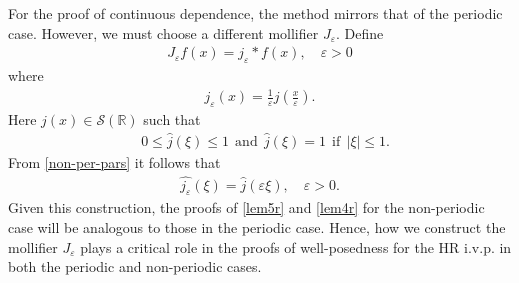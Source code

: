 \documentclass[12pt,reqno]{amsart}
\newcommand{\rr}{\mathbb{R}}
\newcommand{\ee}{\varepsilon}
\theoremstyle{plain}  %
\theoremstyle{definition}
\begin{document}
For the proof of continuous dependence, the method mirrors that 
of the periodic case. However, we must choose a different mollifier 
$J_\ee$. Define
\begin{equation}
\begin{split}
J_\ee f(x) = j_\ee * f(x), \quad \ee>0
\end{split}
\end{equation}
%
%
where 
\begin{equation}
	\label{non-per-pars}
\begin{split}
j_\ee(x) = \frac{1}{\ee} j \left (\frac{x}{\ee} \right ).
\end{split}
\end{equation}
Here
$j(x) \in \mathcal{S}(\rr)$ such that
%
%
\begin{equation}
\begin{split}
	& 0 \le \widehat{j}(\xi) \le 1 \ \ \text{and}
	\ \ \widehat{j}(\xi) = 1 \ \ \text{if} \ \ |\xi| \le 1.
\end{split}
\end{equation}
%
%
%
%
%
%
%
%
From \eqref{non-per-pars} it follows that 
%
%
\begin{equation}
\begin{split}
\widehat{j_\ee}(\xi) = \widehat{j }(\ee \xi), \quad \ee > 0.
\end{split}
\end{equation}
%
%
%
%
Given this construction, the proofs of \autoref{lem5r} and 
\autoref{lem4r} for the non-periodic case will be
analogous to those in the periodic case.
Hence, how we
construct the mollifier $J_\ee$ plays a critical role in the proofs of
well-posedness for the HR i.v.p. in both the periodic and non-periodic 
cases. %
\end{document}

